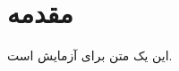\documentclass{book}
\begin{document}
\tableofcontents
\chapter{مقدمه}
این یک متن برای آزمایش است.
\end{document}
